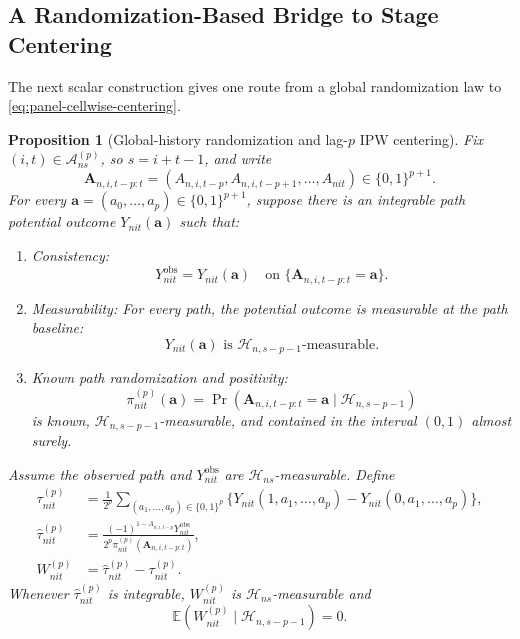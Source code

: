 \documentclass[11pt]{article}
\renewcommand\vec[1]{\boldsymbol{#1}}
\newcommand{\E}{\mathbb{E}}
\newcommand{\Hcal}{\mathcal{H}}
\newcommand{\A}{\mathcal{A}}
\newtheorem{proposition}{Proposition}
\theoremstyle{definition}
\begin{document}
\subsection{A Randomization-Based Bridge to Stage Centering}

The next scalar construction gives one route from a global randomization law to \eqref{eq:panel-cellwise-centering}.

\begin{proposition}[Global-history randomization and lag-\(p\) IPW centering]
\label{prop:panel-ipw-centering}
Fix \((i,t)\in\A^{(p)}_{ns}\), so \(s=i+t-1\), and write
\[
\vec A_{n,i,t-p:t}
=(A_{n,i,t-p},A_{n,i,t-p+1},\ldots,A_{nit})\in\{0,1\}^{p+1}.
\]
For every \(\vec a=(a_0,\ldots,a_p)\in\{0,1\}^{p+1}\), suppose there is an integrable path potential outcome \(Y_{nit}(\vec a)\) such that:
\begin{enumerate}
\item \emph{Consistency:}
\[
Y_{nit}^{\mathrm{obs}}=Y_{nit}(\vec a)
\quad\text{on }\{\vec A_{n,i,t-p:t}=\vec a\}.
\]
\item \emph{Measurability:}
For every path, the potential outcome is measurable at the path baseline:
\[
Y_{nit}(\vec a)\text{ is }\Hcal_{n,s-p-1}\text{-measurable}.
\]
\item \emph{Known path randomization and positivity:}
\[
\pi^{(p)}_{nit}(\vec a)
=
\Pr(\vec A_{n,i,t-p:t}=\vec a\mid\Hcal_{n,s-p-1})
\]
is known, \(\Hcal_{n,s-p-1}\)-measurable, and contained in the interval $(0, 1)$ almost surely.
\end{enumerate}
Assume the observed path and \(Y_{nit}^{\mathrm{obs}}\) are \(\Hcal_{ns}\)-measurable.
Define
\begin{align}
\tau^{(p)}_{nit}
&=
\frac1{2^p}
\sum_{(a_1,\ldots,a_p)\in\{0,1\}^p}
\{Y_{nit}(1,a_1,\ldots,a_p)-Y_{nit}(0,a_1,\ldots,a_p)\},
\label{eq:panel-path-estimand}\\
\widehat\tau^{(p)}_{nit}
&=
\frac{(-1)^{1-A_{n,i,t-p}}Y_{nit}^{\mathrm{obs}}}
{2^p\pi^{(p)}_{nit}(\vec A_{n,i,t-p:t})},
\label{eq:panel-path-ipw}\\
W^{(p)}_{nit}
&=\widehat\tau^{(p)}_{nit}-\tau^{(p)}_{nit}.
\end{align}
\vspace{-3pt}Whenever \(\widehat\tau^{(p)}_{nit}\) is integrable, \(W^{(p)}_{nit}\) is \(\Hcal_{ns}\)-measurable and
\vspace{-3pt}
\[
\E(W^{(p)}_{nit}\mid\Hcal_{n,s-p-1})=0.
\]
\end{proposition}
\end{document}
